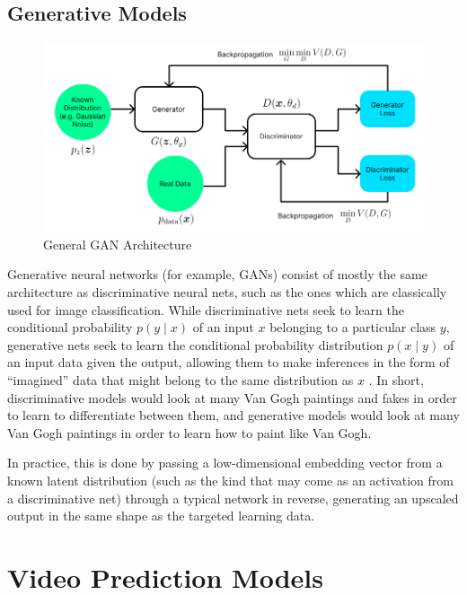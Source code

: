 \documentclass{scrartcl}
\begin{document}
\subsection{Generative Models}
\label{subsec:generative}

\begin{figure}[H]
	\begin{center}
		\includegraphics[width=1\textwidth]{figures/gan_arch.png}
	\end{center}
	\caption{General GAN Architecture}
	\label{fig:gan_arch}
\end{figure}

Generative neural networks (for example, GANs) consist of mostly the same
architecture as discriminative neural nets, such as the ones which are
classically used for image classification. While discriminative nets seek to
learn the conditional probability $p(y \mid x)$ of an input $x$ belonging to a
particular class $y$, generative nets seek to learn the conditional probability
distribution $p(x \mid y)$ of an input data given the output, allowing them to
make inferences in the form of ``imagined'' data that might belong to the same
distribution as $x$ \cite{gan_original}. In short, discriminative models would
look at many Van Gogh paintings and fakes in order to learn to differentiate
between them, and generative models would look at many Van Gogh paintings in
order to learn how to paint like Van Gogh.

In practice, this is done by passing a low-dimensional embedding vector from a
known latent distribution (such as the kind that may come as an activation from
a discriminative net) through a typical network in reverse, generating an
upscaled output in the same shape as the targeted learning data.

\section{Video Prediction Models}
\label{sec:families}
\end{document}
